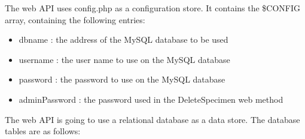 		The web API uses config.php as a configuration store. It contains the \$CONFIG array, containing the following entries:
		
		 \begin{itemize}
			 	\item dbname : the address of the MySQL database to be used
			 	\item username : the user name to use on the MySQL database
			 	\item password : the password to use on the MySQL database
			 	\item adminPassword : the password used in the DeleteSpecimen web method
		\end{itemize}
        The web API is going to use a relational database as a data store.
        The database tables are as follows:

